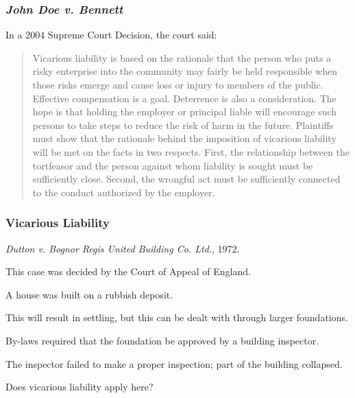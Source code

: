 \begin{frame}
\frametitle{\textit{John Doe v. Bennett}}

In a 2004 Supreme Court Decision, the court said:

\begin{quote}
Vicarious liability is based on the rationale that the person who puts a risky enterprise into the community may fairly be held responsible when those risks emerge and cause loss or injury to members of the public.  Effective compensation is a goal.  Deterrence is also a consideration.  The hope is that holding the employer or principal liable will encourage such persons to take steps to reduce the risk of harm in the future. Plaintiffs must show that the rationale behind the imposition of vicarious liability will be met on the facts in two respects. First, the relationship between the tortfeasor and the person against whom liability is sought must be sufficiently close. Second,  the wrongful act must be sufficiently connected to the conduct authorized by the employer. 
\end{quote}


\end{frame}



\begin{frame}
\frametitle{Vicarious Liability}

\textit{Dutton v. Bognor Regis United Building Co. Ltd.}, 1972.

This case was decided by the Court of Appeal of England.

A house was built on a rubbish deposit.

This will result in settling, but this can be dealt with through larger foundations.

By-laws required that the foundation be approved by a building inspector.

The inspector failed to make a proper inspection; part of the building collapsed.

Does vicarious liability apply here?

\end{frame}



